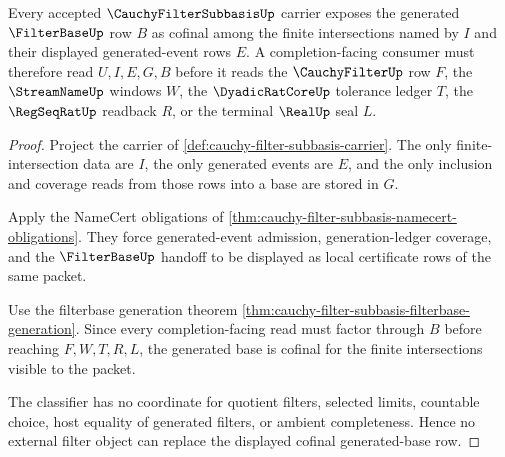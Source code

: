 \begin{theorem}
\label{thm:cauchy-filter-subbasis-generated-base-cofinality}
Every accepted $\CauchyFilterSubbasisUp$ carrier exposes the generated $\FilterBaseUp$ row $B$ as cofinal among the finite intersections named by $I$ and their displayed generated-event rows $E$. A completion-facing consumer must therefore read $U,I,E,G,B$ before it reads the $\CauchyFilterUp$ row $F$, the $\StreamNameUp$ windows $W$, the $\DyadicRatCoreUp$ tolerance ledger $T$, the $\RegSeqRatUp$ readback $R$, or the terminal $\RealUp$ seal $L$.
\end{theorem}
\begin{proof}
Project the carrier of \autoref{def:cauchy-filter-subbasis-carrier}. The only finite-intersection data are $I$, the only generated events are $E$, and the only inclusion and coverage reads from those rows into a base are stored in $G$.

Apply the NameCert obligations of \autoref{thm:cauchy-filter-subbasis-namecert-obligations}. They force generated-event admission, generation-ledger coverage, and the $\FilterBaseUp$ handoff to be displayed as local certificate rows of the same packet.

Use the filterbase generation theorem \autoref{thm:cauchy-filter-subbasis-filterbase-generation}. Since every completion-facing read must factor through $B$ before reaching $F,W,T,R,L$, the generated base is cofinal for the finite intersections visible to the packet.

The classifier has no coordinate for quotient filters, selected limits, countable choice, host equality of generated filters, or ambient completeness. Hence no external filter object can replace the displayed cofinal generated-base row.
\end{proof}

